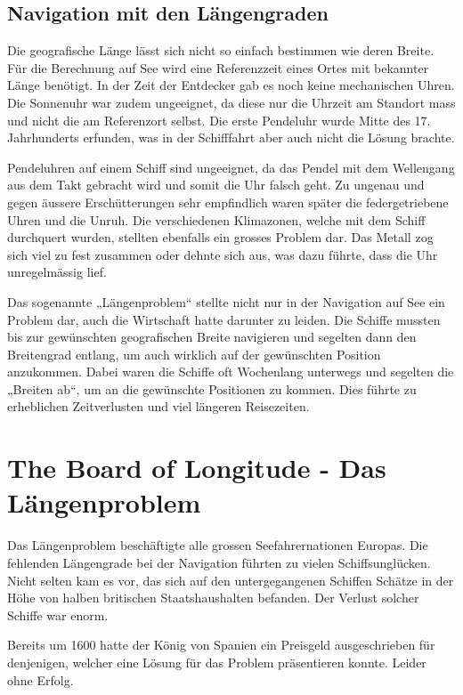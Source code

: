 \begin{refsection}
\subsection{Navigation mit den Längengraden}
Die geografische Länge lässt sich nicht so einfach bestimmen wie deren Breite.
Für die Berechnung auf See wird eine Referenzzeit eines Ortes mit bekannter Länge benötigt.
In der Zeit der Entdecker gab es noch keine mechanischen Uhren. Die Sonnenuhr war zudem ungeeignet, da diese nur die Uhrzeit am Standort mass und nicht die am Referenzort selbst. Die erste Pendeluhr wurde Mitte des 17. Jahrhunderts erfunden, was in der Schifffahrt aber auch nicht die Lösung brachte.

Pendeluhren auf einem Schiff sind ungeeignet, da das Pendel mit dem Wellengang aus dem Takt gebracht wird und somit die Uhr falsch geht.
Zu ungenau und gegen äussere Erschütterungen sehr empfindlich waren später die federgetriebene Uhren und die Unruh. Die verschiedenen Klimazonen, welche mit dem Schiff durchquert wurden, stellten ebenfalls ein grosses Problem dar. Das Metall zog sich viel zu fest zusammen oder dehnte sich aus, was dazu führte, dass die Uhr unregelmässig lief.

Das sogenannte „Längenproblem“ stellte nicht nur in der Navigation auf See ein Problem dar, auch die Wirtschaft hatte darunter zu leiden. Die Schiffe mussten bis zur gewünschten geografischen Breite navigieren und segelten dann den Breitengrad entlang, um auch wirklich auf der gewünschten Position anzukommen. Dabei waren die Schiffe oft Wochenlang unterwegs und segelten die „Breiten ab“, um an die gewünschte Positionen zu kommen. Dies führte zu erheblichen Zeitverlusten und viel längeren Reisezeiten.



\section{The Board of Longitude - Das Längenproblem}
Das Längenproblem beschäftigte alle grossen Seefahrernationen Europas. Die fehlenden Längengrade bei der Navigation führten zu vielen Schiffsunglücken. Nicht selten kam es vor, das sich auf den untergegangenen Schiffen Schätze in der Höhe von halben britischen Staatshaushalten befanden. Der Verlust solcher Schiffe war enorm.

Bereits um 1600 hatte der König von Spanien ein Preisgeld ausgeschrieben für denjenigen, welcher eine Lösung für das Problem präsentieren konnte. Leider ohne Erfolg.


\end{refsection}

